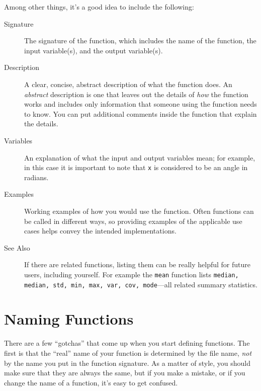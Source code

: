 Among other things, it's a good idea to
include the following:

\begin{description}

\item [Signature] The signature of the function, which includes the name
of the function, the input variable(s), and the output variable(s).

\item [Description] A clear, concise, abstract description of what the function does.
An \emph{abstract} description is one that leaves out the
details of \emph{how} the function works and includes only information
that someone  using the function needs to know.  You can put additional
comments inside the function that explain the details.

\item [Variables] An explanation of what the input and output variables mean; for example,
in this case it is important to note that \lstinline{x} is considered
to be an angle in radians.

\item [Examples] Working examples of how you would use the function.  Often functions can be called in different ways, so providing examples of the applicable use cases helps convey the intended implementations.

\item [See Also] If there are related functions, listing them can be really helpful for future users, including yourself.  For example the \lstinline{mean} function lists \lstinline{median, median, std, min, max, var, cov, mode}---all related summary statistics.

\end{description}


\section{Naming Functions}

There are a few ``gotchas'' that come up when you start defining functions.
The first is that the ``real'' name of your function is determined by the file name, \emph{not} by the name you put in the function signature.  As a matter of style, you
should make sure that they are always the same, but if you
make a mistake, or if you change the name of a function, it's
easy to get confused.


